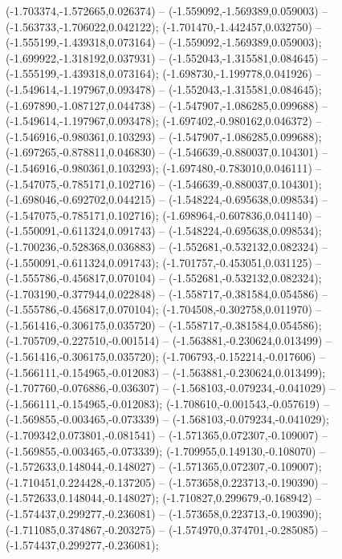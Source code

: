  (-1.703374,-1.572665,0.026374) -- (-1.559092,-1.569389,0.059003) -- (-1.563733,-1.706022,0.042122);
 (-1.701470,-1.442457,0.032750) -- (-1.555199,-1.439318,0.073164) -- (-1.559092,-1.569389,0.059003);
 (-1.699922,-1.318192,0.037931) -- (-1.552043,-1.315581,0.084645) -- (-1.555199,-1.439318,0.073164);
 (-1.698730,-1.199778,0.041926) -- (-1.549614,-1.197967,0.093478) -- (-1.552043,-1.315581,0.084645);
 (-1.697890,-1.087127,0.044738) -- (-1.547907,-1.086285,0.099688) -- (-1.549614,-1.197967,0.093478);
 (-1.697402,-0.980162,0.046372) -- (-1.546916,-0.980361,0.103293) -- (-1.547907,-1.086285,0.099688);
 (-1.697265,-0.878811,0.046830) -- (-1.546639,-0.880037,0.104301) -- (-1.546916,-0.980361,0.103293);
 (-1.697480,-0.783010,0.046111) -- (-1.547075,-0.785171,0.102716) -- (-1.546639,-0.880037,0.104301);
 (-1.698046,-0.692702,0.044215) -- (-1.548224,-0.695638,0.098534) -- (-1.547075,-0.785171,0.102716);
 (-1.698964,-0.607836,0.041140) -- (-1.550091,-0.611324,0.091743) -- (-1.548224,-0.695638,0.098534);
 (-1.700236,-0.528368,0.036883) -- (-1.552681,-0.532132,0.082324) -- (-1.550091,-0.611324,0.091743);
 (-1.701757,-0.453051,0.031125) -- (-1.555786,-0.456817,0.070104) -- (-1.552681,-0.532132,0.082324);
 (-1.703190,-0.377944,0.022848) -- (-1.558717,-0.381584,0.054586) -- (-1.555786,-0.456817,0.070104);
 (-1.704508,-0.302758,0.011970) -- (-1.561416,-0.306175,0.035720) -- (-1.558717,-0.381584,0.054586);
 (-1.705709,-0.227510,-0.001514) -- (-1.563881,-0.230624,0.013499) -- (-1.561416,-0.306175,0.035720);
 (-1.706793,-0.152214,-0.017606) -- (-1.566111,-0.154965,-0.012083) -- (-1.563881,-0.230624,0.013499);
 (-1.707760,-0.076886,-0.036307) -- (-1.568103,-0.079234,-0.041029) -- (-1.566111,-0.154965,-0.012083);
 (-1.708610,-0.001543,-0.057619) -- (-1.569855,-0.003465,-0.073339) -- (-1.568103,-0.079234,-0.041029);
 (-1.709342,0.073801,-0.081541) -- (-1.571365,0.072307,-0.109007) -- (-1.569855,-0.003465,-0.073339);
 (-1.709955,0.149130,-0.108070) -- (-1.572633,0.148044,-0.148027) -- (-1.571365,0.072307,-0.109007);
 (-1.710451,0.224428,-0.137205) -- (-1.573658,0.223713,-0.190390) -- (-1.572633,0.148044,-0.148027);
 (-1.710827,0.299679,-0.168942) -- (-1.574437,0.299277,-0.236081) -- (-1.573658,0.223713,-0.190390);
 (-1.711085,0.374867,-0.203275) -- (-1.574970,0.374701,-0.285085) -- (-1.574437,0.299277,-0.236081);
